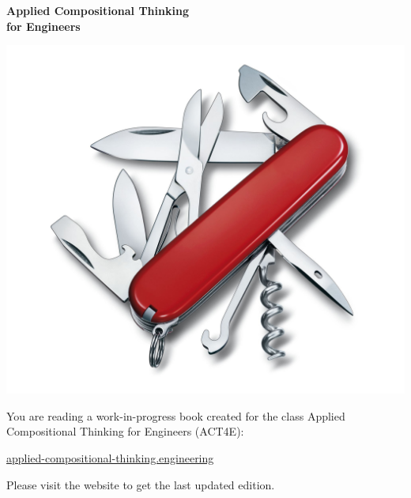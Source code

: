 
\begin{center}

\vspace{3cm}
{\Large\bfseries Applied Compositional Thinking \\ for Engineers}


\end{center}

\vspace{3cm}
\begin{center}
    \includegraphics[width=0.5\linewidth]{pics/knife.jpg}
\end{center}


\vfill

You are reading a work-in-progress book created for the 
class Applied Compositional Thinking for Engineers (ACT4E):

\href{https://applied-compositional-thinking.engineering}{applied-compositional-thinking.engineering}

Please visit the website to get the last updated edition.
